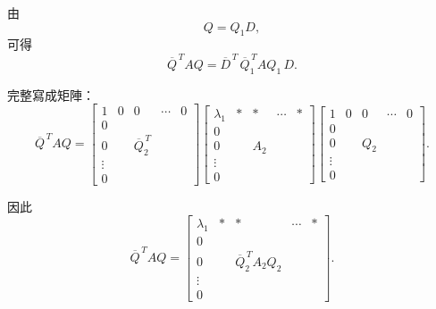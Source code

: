 \documentclass[12pt,a4paper]{article}
\begin{document}
由
\[
    Q=Q_1D,
\]
可得
\[
    \overline{Q}^{\,T}AQ
    =
    \overline{D}^{\,T}\,
    \overline{Q}_1^{\,T}AQ_1\,
    D.
\]

完整寫成矩陣：
\[
    \overline{Q}^{\,T}AQ
    =
    \left[
        \begin{array}{ccccc}
            1      & 0 & 0                    & \cdots & 0 \\
            0      &   &                      &        &   \\
            0      &   & \overline{Q}_2^{\,T} &        &   \\
            \vdots &   &                      &        &   \\
            0      &   &                      &        &
        \end{array}
        \right]
    \left[
        \begin{array}{ccccc}
            \lambda_1 & * & *   & \cdots & * \\
            0         &   &     &        &   \\
            0         &   & A_2 &        &   \\
            \vdots    &   &     &        &   \\
            0         &   &     &        &
        \end{array}
        \right]
    \left[
        \begin{array}{ccccc}
            1      & 0 & 0   & \cdots & 0 \\
            0      &   &     &        &   \\
            0      &   & Q_2 &        &   \\
            \vdots &   &     &        &   \\
            0      &   &     &        &
        \end{array}
        \right].
\]

因此
\[
    \overline{Q}^{\,T}AQ
    =
    \left[
        \begin{array}{ccccc}
            \lambda_1 & * & *                          & \cdots & * \\
            0         &   &                            &        &   \\
            0         &   & \overline{Q}_2^{\,T}A_2Q_2 &        &   \\
            \vdots    &   &                            &        &   \\
            0         &   &                            &        &
        \end{array}
        \right].
\]
\end{document}
